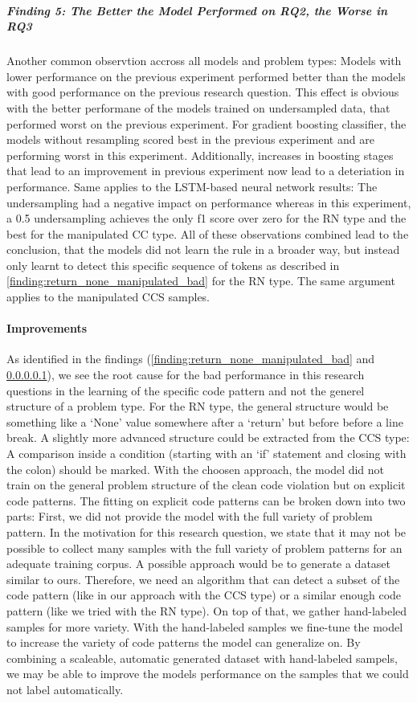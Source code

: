 \subparagraph{Finding 5: The Better the Model Performed on RQ2, the Worse in RQ3} \label{finding:better_vs_worse}
Another common observtion accross all models and problem types: Models with lower performance on the previous experiment performed better than the models with good performance on the previous research question. 
This effect is obvious with the better performane of the models trained on undersampled data, that performed worst on the previous experiment. For gradient boosting classifier, the models without resampling scored best in the previous experiment and are performing worst in this experiment. Additionally, increases in boosting stages that lead to an improvement in previous experiment now lead to a deteriation in performance. Same applies to the LSTM-based neural network results: The undersampling had a negative impact on performance whereas in this experiment, a 0.5 undersampling achieves the only f1 score over zero for the RN type and the best for the manipulated CC type.
All of these observations combined lead to the conclusion, that the models did not learn the rule in a broader way, but instead only learnt to detect this specific sequence of tokens as described in \ref{finding:return_none_manipulated_bad} for the RN type. The same argument applies to the manipulated CCS samples.

\paragraph{Improvements}
As identified in the findings (\ref{finding:return_none_manipulated_bad} and \ref{finding:better_vs_worse}), we see the root cause for the bad performance in this research questions in the learning of the specific code pattern and not the generel structure of a problem type. For the RN type, the general structure would be something like a \enquote*{None} value somewhere after a \enquote*{return} but before before a line break. A slightly more advanced structure could be extracted from the CCS type: A comparison inside a condition (starting with an \enquote*{if} statement and closing with the colon) should be marked. With the choosen approach, the model did not train on the general problem structure of the clean code violation but on explicit code patterns. The fitting on explicit code patterns can be broken down into two parts:
First, we did not provide the model with the full variety of problem pattern. In the motivation for this research question, we state that it may not be possible to collect many samples with the full variety of problem patterns for an adequate training corpus. A possible approach would be to generate a dataset similar to ours. Therefore, we need an algorithm that can detect a subset of the code pattern (like in our approach with the CCS type) or a similar enough code pattern (like we tried with the RN type). On top of that, we gather hand-labeled samples for more variety. With the hand-labeled samples we fine-tune the model to increase the variety of code patterns the model can generalize on. By combining a scaleable, automatic generated dataset with hand-labeled sampels, we may be able to improve the models performance on the samples that we could not label automatically.

